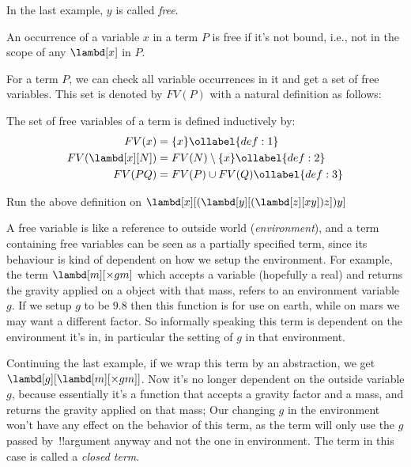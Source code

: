 \documentclass[../../../include/open-logic-section]{subfiles}
\begin{document}
In the last example, $y$ is called \emph{free}. 
\begin{defn}
  An occurrence of a variable $x$ in a term $P$ is free if it's not bound, i.e., not in the scope of any
  $\lambd[x]$ in $P$.
\end{defn}


For a term $P$, we can check all variable occurrences in it and get a set of free
variables. This set is denoted by $FV(P)$ with a natural definition
as follows:

\begin{defn} 
  The set of free variables of a term is defined inductively by:
  \begin{align} 
    FV(x) &= \{x\} \ollabel{def:1} \\
    FV(\lambd[x][N]) &= FV(N) \setminus \{x\}    \ollabel{def:2} \\
    FV(PQ) &= FV(P) \cup FV(Q) \ollabel{def:3}
  \end{align}
\end{defn}

\begin{prob}
  Run the above definition on $\lambd[x][(\lambd[y][(\lambd[z][x y]) z]) y]$
\end{prob}

\begin{explain}
A free variable is like a reference to outside world (\emph{environment}), and a term
containing free variables can be seen as a partially specified term,
since its behaviour is kind of dependent on how we setup the
environment. For example, the term $\lambd[m][\times g m]$ which
accepts a variable (hopefully a real) and returns the gravity applied
on a object with that mass, refers to an environment variable $g$. If we
setup $g$ to be $9.8$  then this function is for use on earth,
while on mars we may want a different factor.
So informally speaking this term is dependent on the environment
it's in, in particular the setting of $g$ in that environment.

Continuing the last example, if we wrap this term by an abstraction, we get
$\lambd[g][\lambd[m][\times g m]]$. Now it's no longer dependent on
the outside variable $g$, because essentially it's a function that
accepts a gravity factor and a mass, and returns the gravity applied
on that mass; Our changing $g$ in the environment won't have any
effect on the behavior of this term, as the term will only use the $g$
passed by~!!{argument} anyway and not the one in environment. The term
in this case is called a \emph{closed term}.
\end{explain}
\end{document}
